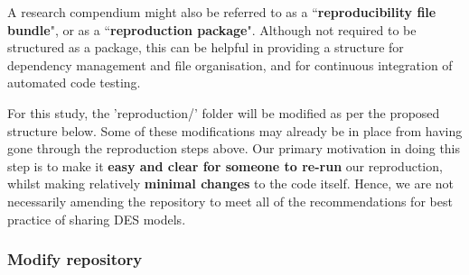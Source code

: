 A research compendium might also be referred to as a ``\textbf{reproducibility file bundle}",\autocite{arguillas_10_2022} or as a ``\textbf{reproduction package}".\autocite{krafczyk_learning_2021} Although not required to be structured as a package, this can be helpful in providing a structure for dependency management and file organisation, and for continuous integration of automated code testing.\autocite{marwick_packaging_2018}

For this study, the 'reproduction/' folder will be modified as per the proposed structure below. Some of these modifications may already be in place from having gone through the reproduction steps above. Our primary motivation in doing this step is to make it \textbf{easy and clear for someone to re-run} our reproduction, whilst making relatively \textbf{minimal changes} to the code itself. Hence, we are not necessarily amending the repository to meet all of the recommendations for best practice of sharing DES models.

\vspace{0.5cm}
\subsubsection{Modify repository}

